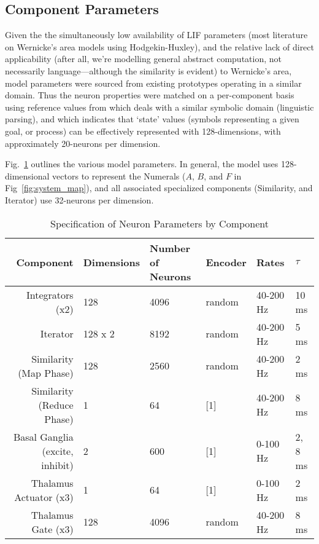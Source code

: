 \documentclass{report}
\begin{document}
\subsection{Component Parameters}
Given the the simultaneously low availability of LIF parameters (most literature on Wernicke\rq{}s area models using Hodgekin-Huxley), and the relative lack of direct applicability (after all, we\rq{}re modelling general abstract computation, not necessarily language---although the similarity is evident) to Wernicke\rq{}s area, model parameters were sourced from existing prototypes operating in a similar domain.
Thus the neuron properties were matched on a per-component basis using reference values from \cite{stewart2014} which deals with a similar symbolic domain (linguistic parsing), and \cite{stewart2011a} which indicates that \lq{}state\rq{} values (symbols representing a given goal, or process) can be effectively represented with 128-dimensions, with approximately 20-neurons per dimension.

Fig.~\ref{tab:model_specification} outlines the various model parameters. 
In general, the model uses 128-dimensional vectors to represent the Numerals ($A$, $B$, and $F$ in Fig~\ref{fig:system_map}), and all associated specialized components (Similarity, and Iterator) use 32-neurons per dimension.


\begin{table}
\centering
\begin{tabular}{r | l l l l l}
	Component		&	Dimensions	& Number of Neurons  & Encoder  & Rates  & $\tau$\\ \hline
	Integrators	(x2)	&	128			& 4096				    & random  & 40-200 Hz  & 10 ms\\
	Iterator 			&	128 x 2		& 8192			    & random  & 40-200 Hz  & 5 ms\\
	Similarity	(Map Phase) 	&	128 & 2560  & random  & 40-200 Hz & 2 ms \\
	Similarity	(Reduce Phase) 	&	1 & 64  & [1]  & 40-200 Hz & 8 ms \\
	Basal Ganglia  (excite, inhibit)	&  2			&	 600				    & [1]  & 0-100 Hz  & 2, 8 ms\\
	Thalamus Actuator (x3) & 1 & 64   &  [1] & 0-100 Hz  & 2 ms\\
	Thalamus Gate (x3)  & 128 & 4096 & random & 40-200 Hz & 8 ms\\ 
\end{tabular}
\caption{Specification of Neuron Parameters by Component}
\label{tab:model_specification}
\end{table}
\end{document}
